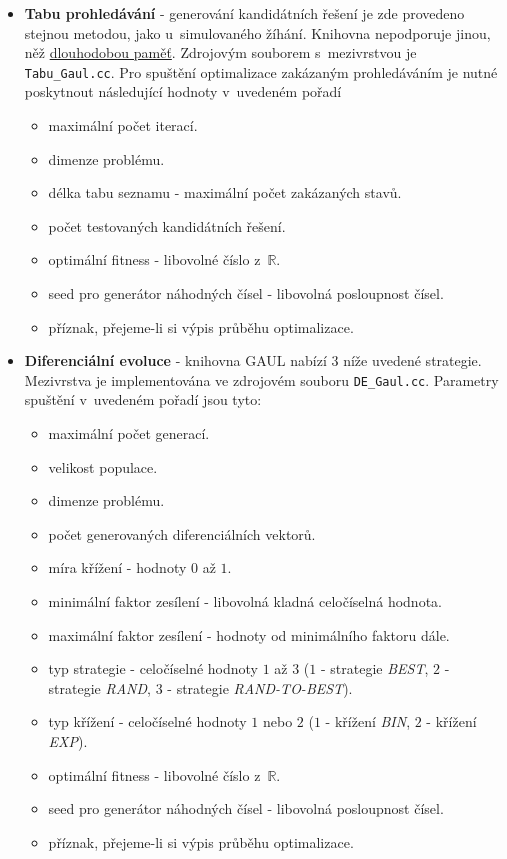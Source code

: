 \begin{itemize}
\item \textbf{{Tabu prohledávání}} - generování kandidátních řešení je zde provedeno stejnou metodou, jako u~simulovaného žíhání. Knihovna nepodporuje jinou, něž \underline{dlouhodobou paměť}. Zdrojovým souborem s~mezivrstvou je \texttt{Tabu\_Gaul.cc}. Pro spuštění optimalizace zakázaným prohledáváním je nutné poskytnout následující hodnoty v~uvedeném pořadí
\begin{itemize}
    \item maximální počet iterací.
    \item dimenze problému.
    \item délka tabu seznamu - maximální počet zakázaných stavů.
    \item počet testovaných kandidátních řešení.
    \item optimální fitness - libovolné číslo z~$\mathbb{R}$.
    \item seed pro generátor náhodných čísel - libovolná posloupnost čísel.
    \item příznak, přejeme-li si výpis průběhu optimalizace.
\end{itemize}

\item \textbf{{Diferenciální evoluce}} - knihovna GAUL nabízí $3$ níže uvedené strategie. Mezivrstva je implementována ve zdrojovém souboru \texttt{DE\_Gaul.cc}. Parametry spuštění v~uvedeném pořadí jsou tyto:
\begin{itemize}
    \item maximální počet generací.
    \item velikost populace.
    \item dimenze problému.
    \item počet generovaných diferenciálních vektorů.
    \item míra křížení - hodnoty $0$ až $1$.
    \item minimální faktor zesílení - libovolná kladná celočíselná hodnota.
    \item maximální faktor zesílení - hodnoty od minimálního faktoru dále.
    \item typ strategie - celočíselné hodnoty $1$ až $3$ ($1$ - strategie \emph{BEST}, $2$ - strategie \emph{RAND}, $3$ - strategie \emph{RAND-TO-BEST}).
    \item typ křížení - celočíselné hodnoty $1$ nebo $2$ ($1$ - křížení \emph{BIN}, $2$ - křížení \emph{EXP}).
    \item optimální fitness - libovolné číslo z~$\mathbb{R}$.
    \item seed pro generátor náhodných čísel - libovolná posloupnost čísel.
    \item příznak, přejeme-li si výpis průběhu optimalizace.
\end{itemize}
\end{itemize}

